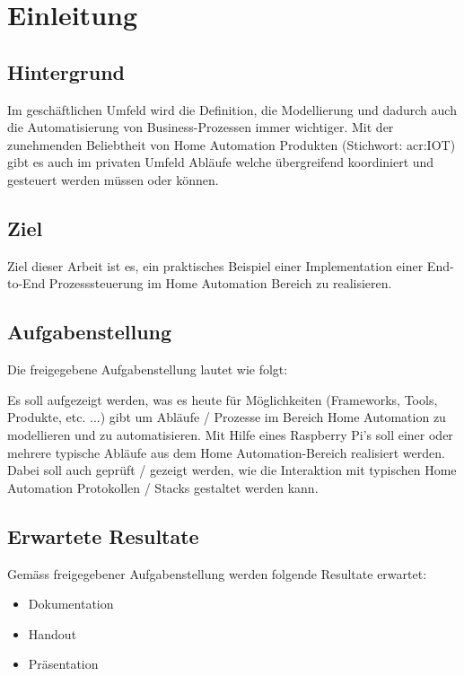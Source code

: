 
\chapter{Einleitung}

\section{Hintergrund}
Im geschäftlichen Umfeld wird die Definition, die Modellierung und dadurch auch die Automatisierung von Business-Prozessen immer wichtiger. Mit der zunehmenden Beliebtheit von Home Automation Produkten (Stichwort: \gls{acr:IOT}) gibt es auch im privaten Umfeld Abläufe welche übergreifend koordiniert und gesteuert werden müssen oder können.

\section{Ziel}
Ziel dieser Arbeit ist es, ein praktisches Beispiel einer Implementation einer
End-to-End Prozesssteuerung im Home Automation Bereich zu realisieren.

\section{Aufgabenstellung} \label{sec:Aufgabenstellung}
Die freigegebene Aufgabenstellung lautet wie folgt:

Es soll aufgezeigt werden, was es heute für Möglichkeiten (Frameworks, Tools,
Produkte, etc. ...) gibt um Abläufe / Prozesse im Bereich Home Automation zu
modellieren und zu automatisieren. Mit Hilfe eines Raspberry Pi's soll einer oder
mehrere typische Abläufe aus dem Home Automation-Bereich realisiert werden.
Dabei soll auch geprüft / gezeigt werden, wie die Interaktion mit typischen
Home Automation Protokollen / Stacks gestaltet werden kann.

\newpage
\section{Erwartete Resultate} \label{sec:ErwarteteResultate}
Gemäss freigegebener Aufgabenstellung werden folgende Resultate erwartet:

\begin{itemize}
\item Dokumentation
\item Handout
\item Präsentation
\end{itemize}


